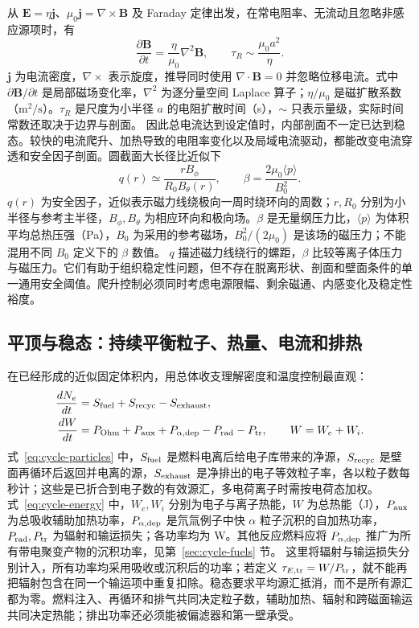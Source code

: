 \documentclass[12pt,fontset=none]{ctexart}
\numberwithin{equation}{section}
\numberwithin{table}{section}
\numberwithin{figure}{section}
\begin{document}
从 $\bm E=\eta\bm j$、$\mu_0\bm j=\nabla\times\bm B$ 及 Faraday 定律出发，在常电阻率、无流动且忽略非感应源项时，有
\begin{equation}\label{eq:cycle-diffusion}
 \frac{\partial\bm B}{\partial t}=\frac{\eta}{\mu_0}\nabla^2\bm B,
 \qquad \tau_R\sim\frac{\mu_0a^2}{\eta}.
\end{equation}
$\bm j$ 为电流密度，$\nabla\times$ 表示旋度，推导同时使用 $\nabla\cdot\bm B=0$ 并忽略位移电流。式中 $\partial\bm B/\partial t$ 是局部磁场变化率，$\nabla^2$ 为逐分量空间 Laplace 算子；$\eta/\mu_0$ 是磁扩散系数（$\mathrm{m^2/s}$）。$\tau_R$ 是尺度为小半径 $a$ 的电阻扩散时间（s），$\sim$ 只表示量级，实际时间常数还取决于边界与剖面。
因此总电流达到设定值时，内部剖面不一定已达到稳态。较快的电流爬升、加热导致的电阻率变化以及局域电流驱动，都能改变电流穿透和安全因子剖面。圆截面大长径比近似下
\begin{equation}\label{eq:cycle-qbeta}
 q(r)\simeq\frac{rB_\phi}{R_0B_\theta(r)},
 \qquad \beta=\frac{2\mu_0\langle p\rangle}{B_0^2}.
\end{equation}
$q(r)$ 为安全因子，近似表示磁力线绕极向一周时绕环向的周数；$r,R_0$ 分别为小半径与参考主半径，$B_\phi,B_\theta$ 为相应环向和极向场。$\beta$ 是无量纲压力比，$\langle p\rangle$ 为体积平均总热压强（Pa），$B_0$ 为采用的参考磁场，$B_0^2/(2\mu_0)$ 是该场的磁压力；不能混用不同 $B_0$ 定义下的 $\beta$ 数值。
$q$ 描述磁力线绕行的螺距，$\beta$ 比较等离子体压力与磁压力。它们有助于组织稳定性问题，但不存在脱离形状、剖面和壁面条件的单一通用安全阈值。爬升控制必须同时考虑电源限幅、剩余磁通、内感变化及稳定性裕度。

\subsection{平顶与稳态：持续平衡粒子、热量、电流和排热}\label{sec:cycle-steady}

在已经形成的近似固定体积内，用总体收支理解密度和温度控制最直观：
\begin{align}
 \frac{dN_e}{dt}&=S_{\rm fuel}+S_{\rm recyc}-S_{\rm exhaust},\label{eq:cycle-particles}\\
 \frac{dW}{dt}&=P_{\rm Ohm}+P_{\rm aux}+P_{\alpha,\rm dep}
 -P_{\rm rad}-P_{\rm tr},\qquad W=W_e+W_i.\label{eq:cycle-energy}
\end{align}
式~\eqref{eq:cycle-particles} 中，$S_{\rm fuel}$ 是燃料电离后给电子库带来的净源，$S_{\rm recyc}$ 是壁面再循环后返回并电离的源，$S_{\rm exhaust}$ 是净排出的电子等效粒子率，各以粒子数每秒计；这些是已折合到电子数的有效源汇，多电荷离子时需按电荷态加权。式~\eqref{eq:cycle-energy} 中，$W_e,W_i$ 分别为电子与离子热能，$W$ 为总热能（J），$P_{\rm aux}$ 为总吸收辅助加热功率，$P_{\alpha,\rm dep}$ 是氘氚例子中快 $\alpha$ 粒子沉积的自加热功率，$P_{\rm rad},P_{\rm tr}$ 为辐射和输运损失；各功率均为 W。其他反应燃料应将 $P_{\alpha,\rm dep}$ 推广为所有带电聚变产物的沉积功率，见第~\ref{sec:cycle-fuels} 节。
这里将辐射与输运损失分别计入，所有功率均采用吸收或沉积后的功率；若定义 $\tau_{E,\rm tr}=W/P_{\rm tr}$，就不能再把辐射包含在同一个输运项中重复扣除。稳态要求平均源汇抵消，而不是所有源汇都为零。燃料注入、再循环和排气共同决定粒子数，辅助加热、辐射和跨磁面输运共同决定热能；排出功率还必须能被偏滤器和第一壁承受。
\end{document}
